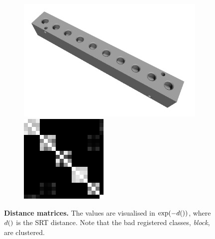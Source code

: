\begin{figure}[ht]
\begin{subfigure}[b]{0.23\linewidth}
		\includegraphics[width=\linewidth]{fig/reg/block.png} \\
		\includegraphics[width=\linewidth]{fig/reg/reg3Dtrain_block.png} 
	\end{subfigure}
	\caption{\textbf{Distance matrices.} The values are visualised in $\exp(-d())$, where $d()$ is the SRT distance. Note that the bad registered classes, \eg \emph{block}, are clustered.}
	\label{fig/reg/reg_srtmatrices}
\end{figure}

